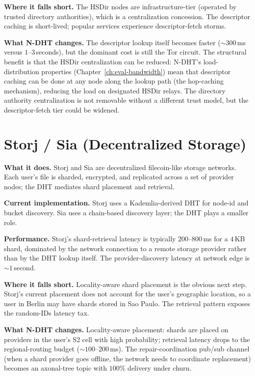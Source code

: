 \documentclass[twoside,nobib]{tufte-book}
\newcommand{\NDHT}{N-DHT\xspace}
\begin{document}
\textbf{Where it falls short.} The HSDir nodes are
infrastructure-tier (operated by trusted directory authorities),
which is a centralization concession. The descriptor caching is
short-lived; popular services experience descriptor-fetch storms.

\textbf{What \NDHT changes.} The descriptor lookup itself
becomes faster ($\sim 300$\,ms versus $1$--$3$\,seconds), but
the dominant cost is still the Tor circuit. The structural
benefit is that the HSDir centralization can be reduced:
\NDHT's load-distribution properties (Chapter~\ref{ch:eval-bandwidth})
mean that descriptor caching can be done at any node along the
lookup path (the hop-caching mechanism), reducing the load on
designated HSDir relays. The directory authority centralization
is not removable without a different trust model, but the
descriptor-fetch tier could be widened.

\section{Storj / Sia (Decentralized Storage)}

\textbf{What it does.} Storj and Sia are decentralized
filecoin-like storage networks. Each user's file is sharded,
encrypted, and replicated across a set of provider nodes; the
DHT mediates shard placement and retrieval.

\textbf{Current implementation.} Storj uses a Kademlia-derived
DHT for node-id and bucket discovery. Sia uses a chain-based
discovery layer; the DHT plays a smaller role.

\textbf{Performance.} Storj's shard-retrieval latency is
typically $200$--$800$\,ms for a $4$\,KB shard, dominated by
the network connection to a remote storage provider rather than
by the DHT lookup itself. The provider-discovery latency at
network edge is $\sim 1$\,second.

\textbf{Where it falls short.} Locality-aware shard placement
is the obvious next step. Storj's current placement does not
account for the user's geographic location, so a user in Berlin
may have shards stored in Sao Paulo. The retrieval pattern
exposes the random-IDs latency tax.

\textbf{What \NDHT changes.} Locality-aware placement: shards
are placed on providers in the user's S2 cell with high
probability; retrieval latency drops to the regional-routing
budget ($\sim 100$--$200$\,ms). The repair-coordination pub/sub
channel (when a shard provider goes offline, the network needs
to coordinate replacement) becomes an axonal-tree topic with
$100\%$ delivery under churn.
\end{document}
